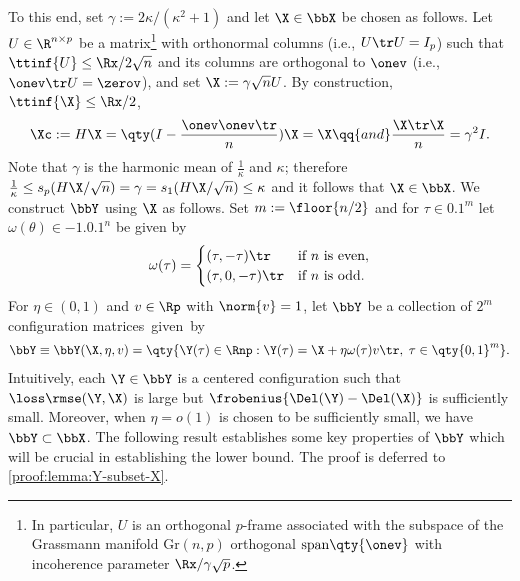 \documentclass[10pt]{article}
\begin{document}
To this end, set $\gamma := 2\kappa/(\kappa^2+1)$ and let $\X \in \bbX$ be chosen as follows. Let $U \in \R^{n \times p}$ be a matrix\footnote{In particular, $U$ is an orthogonal $p$-frame associated with the subspace of the Grassmann manifold $\text{Gr}(n, p)$ orthogonal $\text{span}{\qty{\onev}}$ \citep{edelman1998geometry} with  incoherence parameter $\Rx/\gamma\sqrt{p}$.} with orthonormal columns (i.e., $U\tr U = I_p$) such that $\ttinf{U}\le \Rx/2\sqrt{n}$ and its columns are orthogonal to $\onev$ (i.e., $\onev\tr U = \zerov$), and set $\X := \gamma\sqrt{n}U$. By construction, $\ttinf{\X} \le \Rx/2$,
\begin{align}
    \Xc := H\X = \qty(I - \frac{\onev\onev\tr}{n})\X = \X \qq{and} \frac{\X\tr\X}{n} = \gamma^2 I.\label{eq:X-properties-1}
\end{align}
Note that $\gamma$ is the harmonic mean of $\frac{1}{\kappa}$ and $\kappa$; therefore $\frac{1}{\kappa} \le s_p(H\X/\sqrt{n})= \gamma = s_1(H\X/\sqrt{n}) \le \kappa$ and it follows that $\X \in \bbX$. We construct $\bbY$ using $\X$ as follows. Set $m := \floor{n/2}$ and for $\tau \in \qty{0, 1}^m$ let $\omega(\theta) \in \qty{-1, 0, 1}^n$ be given by
\begin{align}
    \omega(\tau) = \begin{cases}
        (\tau, -\tau)\tr & \text{if $n$ is even},\\
        (\tau, 0, -\tau)\tr & \text{if $n$ is odd}.
    \end{cases}
    \label{eq:omega}
\end{align}
For $\eta \in (0, 1)$ and $v \in \Rp$  with $\norm{v}=1$, let $\bbY$ be a collection of $2^m$ configuration matrices~given~by
\begin{align}
    \bbY \equiv \bbY(\X, \eta, v) = \qty{ \Y(\tau) \in \Rnp : \Y(\tau) = \X + \eta \omega(\tau) v\tr,\; \tau \in \qty{0, 1}^m }.\label{eq:bbY}
\end{align}
Intuitively, each $\Y \in \bbY$ is a centered configuration such that $\loss\rmse(\Y, \X)$ is large but $\frobenius{\Del(\Y) - \Del(\X)}$ is sufficiently small. Moreover, when $\eta = o(1)$ is chosen to be sufficiently small, we have $\bbY \subset \bbX$. The following result establishes some key properties of $\bbY$ which will be crucial in establishing the lower bound. The proof is deferred to \cref{proof:lemma:Y-subset-X}.
\end{document}
